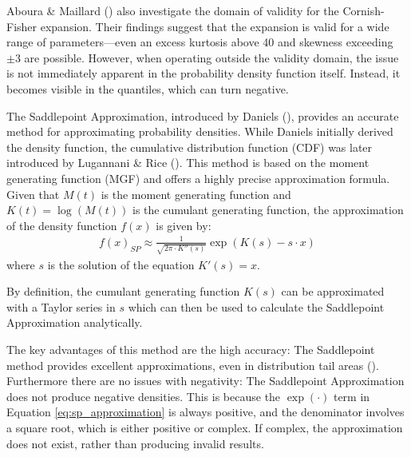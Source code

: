 Aboura \& Maillard (\citeyear{abouraOptionPricingSkewness2016}) also investigate the domain of validity for the Cornish-Fisher expansion. Their findings suggest that the expansion is valid for a wide range of parameters—even an excess kurtosis above 40 and skewness exceeding $\pm 3$ are possible. However, when operating outside the validity domain, the issue is not immediately apparent in the probability density function itself. Instead, it becomes visible in the quantiles, which can turn negative.

The Saddlepoint Approximation, introduced by Daniels (\citeyear{danielsSaddlepointApproximationsStatistics1954}), provides an accurate method for approximating probability densities. While Daniels initially derived the density function, the cumulative distribution function (CDF) was later introduced by Lugannani \& Rice (\citeyear{lugannaniSaddlePointApproximation1980}). This method is based on the moment generating function (MGF) and offers a highly precise approximation formula. Given that $M(t)$ is the moment generating function and $K(t) = \log(M(t))$ is the cumulant generating function, the approximation of the density function $f(x)$ is given by:
\begin{align}
    \label{eq:sp_approximation}
    f(x)_{SP} \approx \frac{1}{\sqrt{2\pi\cdot K''(s)}}\exp(K(s) - s\cdot x)
\end{align}
where $s$ is the solution of the equation $K'(s) = x$.

By definition, the cumulant generating function $K(s)$ can be approximated with a Taylor series in $s$ which can then be used to calculate the Saddlepoint Approximation analytically.

The key advantages of this method are the high accuracy: The Saddlepoint method provides excellent approximations, even in distribution tail areas (\cite{duSystemReliabilityAnalysis2010,reidSaddlepointMethodsStatistical1988}). Furthermore there are no issues with negativity: The Saddlepoint Approximation does not produce negative densities. This is because the $\exp(\cdot)$ term in Equation \eqref{eq:sp_approximation} is always positive, and the denominator involves a square root, which is either positive or complex. If complex, the approximation does not exist, rather than producing invalid results.